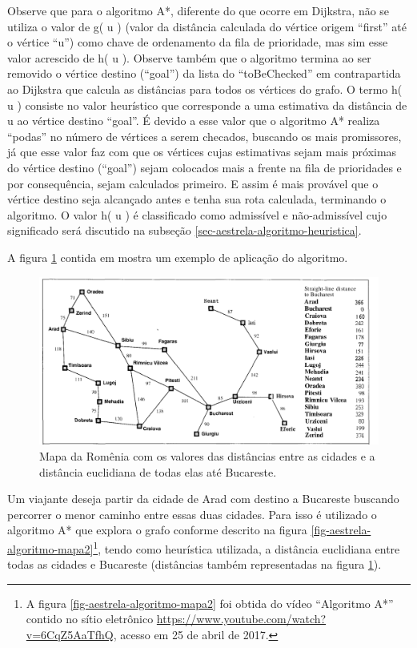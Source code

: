 Observe que para o algoritmo A*, diferente do que ocorre em Dijkstra, não se utiliza o valor de g( u ) (valor da distância calculada do vértice origem ``first'' até o vértice ``u'') como chave de ordenamento da fila de prioridade, mas sim esse valor acrescido de h( u ). Observe também que o algoritmo termina ao ser removido o vértice destino (``goal'') da lista do ``toBeChecked'' em contrapartida ao Dijkstra que calcula as distâncias para todos os vértices do grafo. O termo h( u ) consiste no valor heurístico que corresponde a uma estimativa da distância de u ao vértice destino ``goal''. É devido a esse valor que o algoritmo A* realiza ``podas'' no número de vértices a serem checados, buscando os mais promissores, já que esse valor faz com que os vértices cujas estimativas sejam mais próximas do vértice destino (``goal'') sejam colocados mais a frente na fila de prioridades e por consequência, sejam calculados primeiro. E assim é mais provável que o vértice destino seja alcançado antes e tenha sua rota calculada, terminando o algoritmo. O valor h( u ) é classificado como admissível e não-admissível cujo significado será discutido na subseção \ref{sec-aestrela-algoritmo-heuristica}.

A figura \ref{fig-aestrela-algoritmo-mapa1} contida em  mostra um exemplo de aplicação do algoritmo.

\begin{figure}[H]
\centering
\includegraphics[width=.90\textwidth]{figuras/Aestrela-mapa1} 
\caption{Mapa da Romênia com os valores das distâncias entre as cidades e a distância euclidiana de todas elas até Bucareste.}
\label{fig-aestrela-algoritmo-mapa1}
\end{figure}
\newpage
Um viajante deseja partir da cidade de Arad com destino a Bucareste buscando percorrer o menor caminho entre essas duas cidades. Para isso é utilizado o algoritmo A* que explora o grafo conforme descrito na figura \ref{fig-aestrela-algoritmo-mapa2}\footnote{A figura \ref{fig-aestrela-algoritmo-mapa2} foi obtida do vídeo ``Algoritmo A*'' contido no sítio eletrônico \url{https://www.youtube.com/watch?v=6CqZ5AaTfhQ}, acesso em 25 de abril de 2017.}, tendo como heurística utilizada, a distância euclidiana entre todas as cidades e Bucareste (distâncias também representadas na figura \ref{fig-aestrela-algoritmo-mapa1}).

